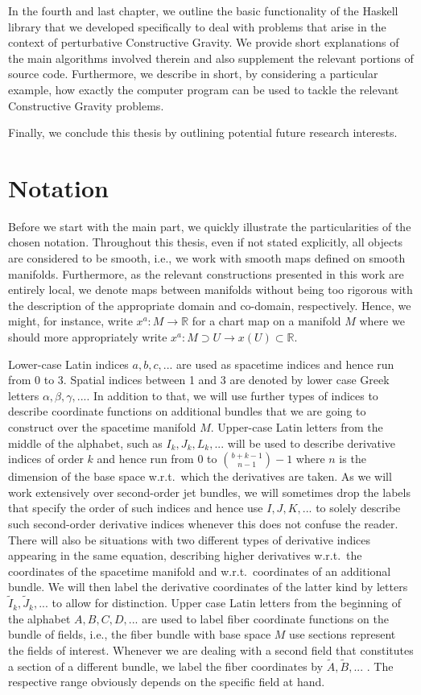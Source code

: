In the fourth and last chapter, we outline the basic functionality of the Haskell library that we developed specifically to deal with problems that arise in the context of perturbative Constructive Gravity. We provide short explanations of the main algorithms involved therein and also supplement the relevant portions of source code. Furthermore, we describe in short, by considering a particular example, how exactly the computer program can be used to tackle the relevant Constructive Gravity problems.

Finally, we conclude this thesis by outlining potential future research interests.

\section*{Notation}

Before we start with the main part, we quickly illustrate the particularities of the chosen notation. Throughout this thesis, even if not stated explicitly, all objects are considered to be smooth, i.e., we work with smooth maps defined on smooth manifolds. 
Furthermore, as the relevant constructions presented in this work are entirely local, we denote maps between manifolds without being too rigorous with the description of the appropriate domain and co-domain, respectively. Hence, we might, for instance, write $x^a : M
\rightarrow \mathbb{R}$ for a chart map on a manifold $M$ where we should more appropriately write $x^a : M \supset U  \rightarrow x(U) \subset \mathbb{R} $. 

Lower-case Latin indices $a,b,c,...$ are used as spacetime indices and hence run from 0 to 3. Spatial indices between 1 and 3 are denoted by lower case Greek letters $\alpha,\beta,\gamma,...$. In addition to that, we will use further types of indices to describe coordinate functions on additional bundles that we are going to construct over the spacetime manifold $M$. Upper-case Latin letters from the middle of the alphabet, such as $I_k,J_k,L_k,...$ will be used to describe derivative indices of order $k$ and hence run from $0$ to $\binom{b+k-1}{n-1}-1$ where $n$ is the dimension of the base space w.r.t.\ which the derivatives are taken. As we will work extensively over second-order jet bundles, we will sometimes drop the labels that specify the order of such indices and hence use $I,J,K,...$ to solely describe such second-order derivative indices whenever this does not confuse the reader.
There will also be situations with two different types of derivative indices appearing in the same equation, describing higher derivatives w.r.t.\ the coordinates of the spacetime manifold and w.r.t.\ coordinates of an additional bundle. We will then label the derivative coordinates of the latter kind by letters $\tilde{I}_k, \tilde{J}_k,...$ to allow for distinction.
Upper case Latin letters from the beginning of the alphabet $A,B,C,D,...$ are used to label fiber coordinate functions on the bundle of fields, i.e., the fiber bundle with base space $M$ use sections represent the fields of interest. Whenever we are dealing with a second field that constitutes a section of a different bundle, we label the fiber coordinates by $\tilde{A}, \tilde{B},...$ . The respective range obviously depends on the specific field at hand.

